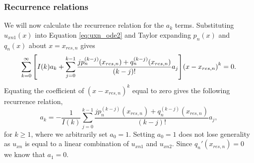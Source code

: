 \subsubsection{Recurrence relations}

We will now calculate the recurrence relation for the $a_k$ terms. Substituting $u_{xn1}(x)$ into Equation \eqref{eq:uxn_ode2} and Taylor expanding $p_n(x)$ and $q_n(x)$ about $x=x_{res,n}$ gives
\[\sum_{k=0}^\infty\qty[I(k)a_k+\sum_{j=0}^{k-1}\frac{jp_n^{(k-j)}(x_{res,n})+q_n^{(k-j)}(x_{res,n})}{(k-j)!}a_j] \qty(x-x_{res,n})^k=0.\]
Equating the coefficient of $(x-x_{res,n})^k$ equal to zero gives the following recurrence relation,
\begin{equation}
    a_k = -\frac{1}{I(k)}\sum_{j=0}^{k-1}\frac{jp_n^{(k-j)}(x_{res,n})+q_n^{(k-j)}(x_{res,n})}{(k-j)!}a_j,
\end{equation}
for $k\ge1$, where we arbitrarily set $a_0=1$. Setting $a_0=1$ does not lose generality as $u_{xn}$ is equal to a linear combination of $u_{xn1}$ and $u_{xn2}$. Since $q_n'(x_{res,n})=0$ we know that $a_1=0$.

